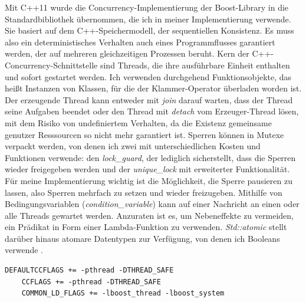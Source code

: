 \documentclass[a4paper,12pt,twoside]{article}
\newcommand{\Fb}[1]{\textit{#1}} %
\begin{document}
{Mit C++11 wurde die Concurrency-Implementierung der Boost-Library in die Standardbibliothek übernommen, die ich in meiner Implementierung verwende. Sie basiert auf dem C++-Speichermodell, der sequentiellen Konsistenz. Es muss also ein deterministisches Verhalten auch eines Programmflusses garantiert werden, der auf mehreren gleichzeitigen Prozessen beruht. Kern der C++-Concurrency-Schnittstelle sind Threads, die ihre ausführbare Einheit enthalten und sofort gestartet werden. Ich verwenden durchgehend Funktionsobjekte, das heißt Instanzen von Klassen, für die der Klammer-Operator überladen worden ist. Der erzeugende Thread kann entweder mit \Fb{join} darauf warten, dass der Thread seine Aufgaben beendet oder den Thread mit \Fb{detach} vom Erzeuger-Thread lösen, mit dem Risiko von undefiniertem Verhalten, da die Existenz gemeinsame genutzer Resssourcen so nicht mehr garantiert ist. Sperren können in Mutexe verpackt werden, von denen ich zwei mit unterschiedlichen Kosten und Funktionen verwende: den \Fb{lock\_guard}, der lediglich sicherstellt, dass die Sperren wieder freigegeben werden und der \Fb{unique\_lock} mit erweiterter Funktionalität. Für meine Implementierung wichtig ist die Möglichkeit, die Sperre pausieren zu lassen, also Sperren mehrfach zu setzen und wieder freizugeben. Mithilfe von Bedingungsvariablen (\Fb{condition\_variable}) kann auf einer Nachricht an einen oder alle Threads gewartet werden. Anzuraten ist es, um Nebeneffekte zu vermeiden, ein Prädikat in Form einer Lambda-Funktion zu verwenden. \Fb{Std::atomic} stellt darüber hinaus atomare Datentypen zur Verfügung, von denen ich Booleans verwende \parencite{Grimm2018}. 

\begin{minipage}{\linewidth}
	\begin{lstlisting}[caption={Flags der MThreaded-Algebra}, label=list:flags]
	DEFAULTCCFLAGS += -pthread -DTHREAD_SAFE
	CCFLAGS += -pthread -DTHREAD_SAFE
	COMMON_LD_FLAGS += -lboost_thread -lboost_system
	\end{lstlisting}
\end{minipage}

}
\end{document}
